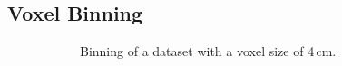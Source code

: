 \subsection{Voxel Binning} \label{contributions:usar:binning}
\begin{figure}
\centering
\begin{subfigure}[b]{0.3\textwidth}
    \caption{Binning of a dataset with a voxel size of 4\,cm.}
    \label{contributions:usar:binning:4}
\end{subfigure}
\hspace*{3mm}
\begin{subfigure}[b]{0.3\textwidth}

\end{subfigure}
\end{figure}
